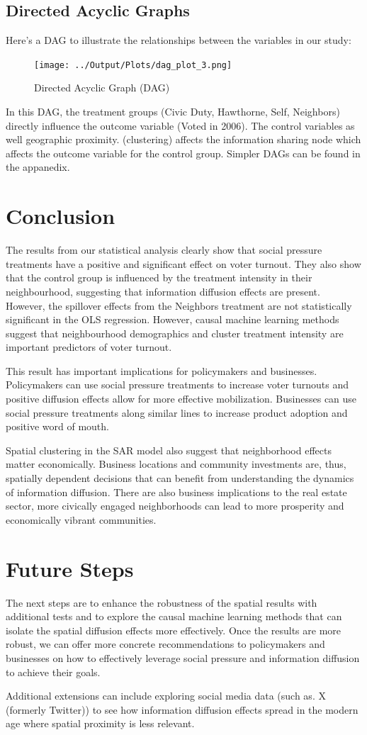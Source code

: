 \documentclass[11pt]{article}
\begin{document}
\subsection{Directed Acyclic Graphs}
Here's a DAG to illustrate the relationships between the variables in our study:
\begin{figure}[H]
    \centering
    \texttt{[image: ../Output/Plots/dag\_plot\_3.png]}
    \caption{Directed Acyclic Graph (DAG)}
    \label{fig:dag}
\end{figure}
In this DAG, the treatment groups (Civic Duty, Hawthorne, Self, Neighbors) directly influence the outcome variable (Voted in 2006). The control variables as well geographic proximity. (clustering) affects the information sharing node which affects the outcome variable for the control group. Simpler DAGs can be found in the appanedix.

\section{Conclusion}
The results from our statistical analysis clearly show that social pressure treatments have a positive and significant effect on voter turnout. They also show that the control group is influenced by the treatment intensity in their neighbourhood, suggesting that information diffusion effects are present. However, the spillover effects from the Neighbors treatment are not statistically significant in the OLS regression. However, causal machine learning methods suggest that neighbourhood demographics and cluster treatment intensity are important predictors of voter turnout.

This result has important implications for policymakers and businesses. Policymakers can use social pressure treatments to increase voter turnouts and positive diffusion effects allow for more effective mobilization. Businesses can use social pressure treatments along similar lines to increase product adoption and positive word of mouth. 

Spatial clustering in the SAR model also suggest that neighborhood effects matter economically. Business locations and community investments are, thus, spatially dependent decisions that can benefit from understanding the dynamics of information diffusion. There are also business implications to the real estate sector, more civically engaged neighborhoods can lead to more prosperity and economically vibrant communities.

\section{Future Steps}
The next steps are to enhance the robustness of the spatial results with additional tests and to explore the causal machine learning methods that can isolate the spatial diffusion effects more effectively. Once the results are more robust, we can offer more concrete recommendations to policymakers and businesses on how to effectively leverage social pressure and information diffusion to achieve their goals.

Additional extensions can include exploring social media data (such as. X (formerly Twitter)) to see how information diffusion effects spread in the modern age where spatial proximity is less relevant.


\end{document}

